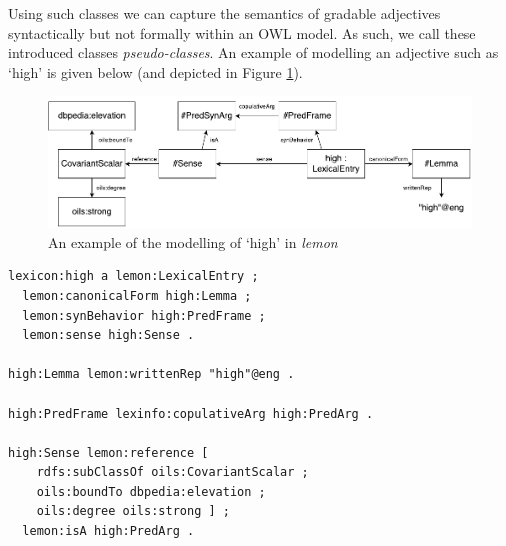 \documentclass[11pt]{article}
\begin{document}
Using such classes we can capture the semantics of gradable adjectives 
syntactically but not formally within an OWL model. As such, we call these 
introduced classes \emph{pseudo-classes}. An example of modelling an adjective 
such as `high' is given below (and depicted in Figure \ref{high-example}).

\begin{figure}
\includegraphics[width=\textwidth]{high-example}
\caption{An example of the modelling of `high' in \emph{lemon}\label{high-example}}
\end{figure}

\begin{small}\begin{verbatim}
lexicon:high a lemon:LexicalEntry ;
  lemon:canonicalForm high:Lemma ;
  lemon:synBehavior high:PredFrame ;
  lemon:sense high:Sense .

high:Lemma lemon:writtenRep "high"@eng .

high:PredFrame lexinfo:copulativeArg high:PredArg .

high:Sense lemon:reference [
    rdfs:subClassOf oils:CovariantScalar ;
    oils:boundTo dbpedia:elevation ;
    oils:degree oils:strong ] ;
  lemon:isA high:PredArg .
\end{verbatim}\end{small}

\end{document}
